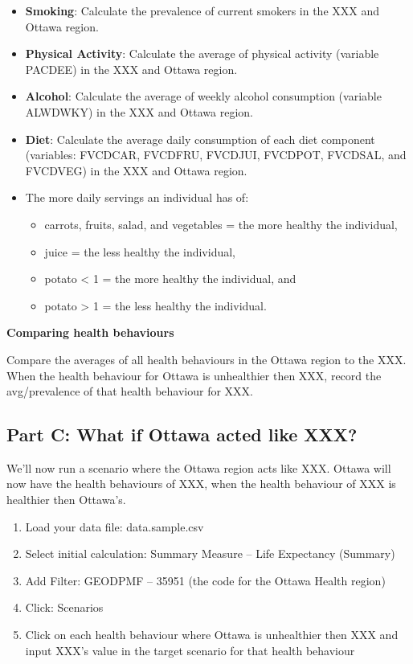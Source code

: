 \documentclass[]{book}
\providecommand{\tightlist}{%
  \setlength{\itemsep}{0pt}\setlength{\parskip}{0pt}}
\begin{document}
\begin{itemize}
\item
  \textbf{Smoking}: Calculate the prevalence of current smokers in the
  XXX and Ottawa region.
\item
  \textbf{Physical Activity}: Calculate the average of physical activity
  (variable PACDEE) in the XXX and Ottawa region.
\item
  \textbf{Alcohol}: Calculate the average of weekly alcohol consumption
  (variable ALWDWKY) in the XXX and Ottawa region.
\item
  \textbf{Diet}: Calculate the average daily consumption of each diet
  component (variables: FVCDCAR, FVCDFRU, FVCDJUI, FVCDPOT, FVCDSAL, and
  FVCDVEG) in the XXX and Ottawa region.
\item
  The more daily servings an individual has of:

  \begin{itemize}
  \tightlist
  \item
    carrots, fruits, salad, and vegetables = the more healthy the
    individual,
  \item
    juice = the less healthy the individual,
  \item
    potato \textless{} 1 = the more healthy the individual, and
  \item
    potato \textgreater{} 1 = the less healthy the individual.
  \end{itemize}
\end{itemize}

\textbf{Comparing health behaviours}

Compare the averages of all health behaviours in the Ottawa region to
the XXX. When the health behaviour for Ottawa is unhealthier then XXX,
record the avg/prevalence of that health behaviour for XXX.

\subsection{Part C: What if Ottawa acted like
XXX?}\label{part-c-what-if-ottawa-acted-like-xxx}

We'll now run a scenario where the Ottawa region acts like XXX. Ottawa
will now have the health behaviours of XXX, when the health behaviour of
XXX is healthier then Ottawa's.

\begin{enumerate}
\def\labelenumi{\arabic{enumi}.}
\item
  Load your data file: data.sample.csv
\item
  Select initial calculation: Summary Measure -- Life Expectancy
  (Summary)
\item
  Add Filter: GEODPMF -- 35951 (the code for the Ottawa Health region)
\item
  Click: Scenarios
\item
  Click on each health behaviour where Ottawa is unhealthier then XXX
  and input XXX's value in the target scenario for that health behaviour
\end{enumerate}
\end{document}
